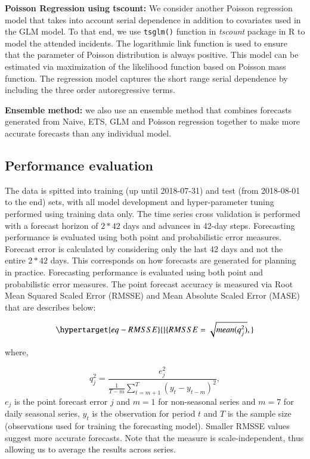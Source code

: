 \documentclass[
  authoryear,
  preprint,
  3p]{elsarticle}
\begin{document}
\textbf{Poisson Regression using tscount: } We consider another Poisson
regression model that takes into account serial dependence in addition
to covariates used in the GLM model. To that end, we use
\texttt{tsglm()} function in \emph{tscount} package in R to model the
attended incidents. The logarithmic link function is used to ensure that
the parameter of Poisson distribution is always positive. This model can
be estimated via maximization of the likelihood function based on
Poisson mass function. The regression model captures the short range
serial dependence by including the three order autoregressive terms.

\textbf{Ensemble method:} we also use an ensemble method that combines
forecasts generated from Naive, ETS, GLM and Poisson regression together
to make more accurate forecasts than any individual model.

\hypertarget{performance-evaluation}{%
\subsection{Performance evaluation}\label{performance-evaluation}}

The data is spitted into training (up until 2018-07-31) and test (from
2018-08-01 to the end) sets, with all model development and
hyper-parameter tuning performed using training data only. The time
series cross validation is performed with a forecast horizon of \(2*42\)
days and advances in 42-day steps. Forecasting performance is evaluated
using both point and probabilistic error measures. Forecast error is
calculated by considering only the last 42 days and not the entire
\(2*42\) days. This corresponds on how forecasts are generated for
planning in practice. Forecasting performance is evaluated using both
point and probabilistic error measures. The point forecast accuracy is
measured via Root Mean Squared Scaled Error (RMSSE) and Mean Absolute
Scaled Error (MASE) that are describes below:

\begin{equation}\protect\hypertarget{eq-RMSSE}{}{
RMSSE = \sqrt{mean(q_{j}^2)},
}\label{eq-RMSSE}\end{equation}

where,

\[
q^2_{j} = \frac{ e^2_{j}}
    {\frac{1}{T-m}\sum_{t=m+1}^T (y_{t}-y_{t-m})^2},
\] \(e_{j}\) is the point forecast error \(j\) and \(m = 1\) for
non-seasonal series and \(m = 7\) for daily seasonal series, \(y_t\) is
the observation for period \(t\) and \(T\) is the sample size
(observations used for training the forecasting model). Smaller RMSSE
values suggest more accurate forecasts. Note that the measure is
scale-independent, thus allowing us to average the results across
series.
\end{document}
